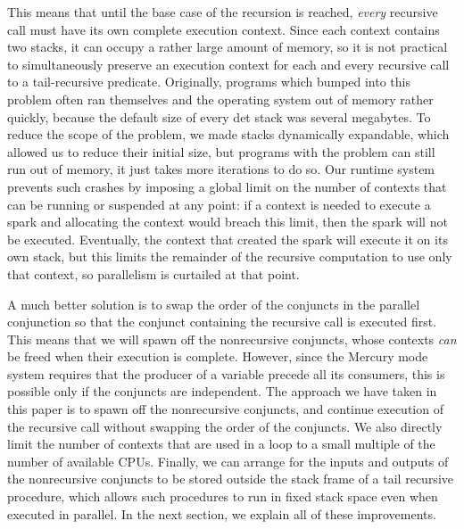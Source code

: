 This means that until the base case of the recursion is reached,
\emph{every} recursive call must have its own complete execution context.
Since each context contains two stacks,
it can occupy a rather large amount of memory,
so it is not practical to simultaneously preserve an execution context
for each and every recursive call to a tail-recursive predicate.
Originally, programs which bumped into this problem
often ran themselves and the operating system out of memory rather quickly,
because the default size of every det stack was several megabytes.
To reduce the scope of the problem,
we made stacks dynamically expandable,
which allowed us to reduce their initial size,
but programs with the problem can still run out of memory,
it just takes more iterations to do so.
\label{sec:context_limit}
Our runtime system prevents such crashes
by imposing a global limit on the number of contexts
that can be running or suspended at any point:
if a context is needed to execute a spark
and allocating the context would breach this limit,
then the spark will not be executed.
Eventually, the context that created the spark will execute it on its
own stack, but this limits the remainder of the recursive computation
to use only that context, so parallelism is curtailed at that point.

A much better solution is to swap the order of the conjuncts
in the parallel conjunction
so that the conjunct containing the recursive call is executed first.
This means that we will spawn off the nonrecursive conjuncts,
whose contexts \emph{can} be freed when their execution is complete.
However, since the Mercury mode system requires that
the producer of a variable precede all its consumers,
this is possible only if the conjuncts are independent.
The approach we have taken in this paper
is to spawn off the nonrecursive conjuncts,
and continue execution of the recursive call
without swapping the order of the conjuncts.
We also directly limit the number of contexts that are used in a loop
to a small multiple of the number of available CPUs.
Finally, we can arrange for
the inputs and outputs of the nonrecursive conjuncts
to be stored outside the stack frame of a tail recursive procedure,
which allows such procedures to run in fixed stack space
even when executed in parallel.
In the next section, we explain all of these improvements.

%

